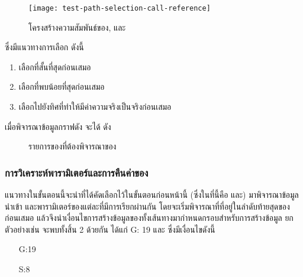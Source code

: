 \begin{figure}[h!]
    \texttt{[image: test-path-selection-call-reference]}
    \caption{โครงสร้างความสัมพันธ์ของ\class {},  และ}
    \label{fig:callreferences}
\end{figure}

\newpage
ซึ่งมีแนวทางการเลือก{\TestPath} ดังนี้
\begin{enumerate}
    \item เลือก{\TestPath}ที่สั้นที่สุดก่อนเสมอ
    \item เลือก{\TestPath}ที่พบ{\PredicateNode}น้อยที่สุดก่อนเสมอ
    \item เลือก{\TestPath}ไปยังทิศที่ทำให้{\PredicateNode}มีค่าความจริงเป็นจริงก่อนเสมอ
\end{enumerate}

เมื่อพิจารณาข้อมูลกราฟดัง  จะได้{\TestPath}  ดัง
\begin{figure}
    \centering
    \caption{รายการของ{\Node}ที่ต้องพิจารณาของ{\TestPath} }
    \label{fig:exampleTestPathP1}
\end{figure}

\subsubsection{การวิเคราะห์พารามิเตอร์และการคืนค่าของ{\method}}

แนวทางในขั้นตอนนี้จะนำ{\TestPath}ที่ได้คัดเลือกไว้ในขั้นตอนก่อนหน้านี้ (ซึ่งในที่นี้คือ  และ) มาพิจารณาข้อมูลนำเข้า
และพารามิเตอร์ของแต่ละ{\method}ที่มีการเรียกผ่านกัน โดยจะเริ่มพิจารณาที่{\PredicateNode}ที่อยู่ในลำดับท้ายสุดของ{\TestPath}ก่อนเสมอ 
แล้วจึงนำเงื่อนไขการสร้างข้อมูลของทั้งเส้นทางมากำหนดกรอบสำหรับการสร้างข้อมูล 
ยกตัวอย่างเช่น  จะพบ{\PredicateNode}ทั้งสิ้น 2 {\Node} ด้วยกัน ได้แก่ {G: 19} และ 
ซึ่งมีเงื่อนไขดังนี้

\begin{enumerate}
    \item[G:19]  \label{itm:studentscore}
    \item[S:8]   \label{itm:studentid}
\end{enumerate}

